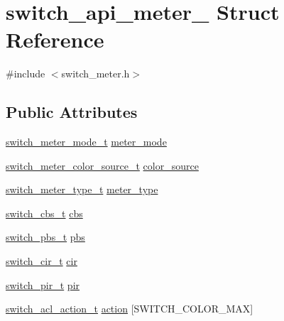 \hypertarget{structswitch__api__meter__}{\section{switch\+\_\+api\+\_\+meter\+\_\+ Struct Reference}
\label{structswitch__api__meter__}
}


{\ttfamily \#include $<$switch\+\_\+meter.\+h$>$}

\subsection*{Public Attributes}
\begin{DoxyCompactItemize}
\item 
\hyperlink{group__Meters_ga3fa4bfd778bf4f4b0f4bebef85f70284}{switch\+\_\+meter\+\_\+mode\+\_\+t} \hyperlink{structswitch__api__meter___a605f435903aa93df506e45ca7acae9fb}{meter\+\_\+mode}
\item 
\hyperlink{group__Meters_ga5406e13de6b3be14a1ec8dd74ede4c55}{switch\+\_\+meter\+\_\+color\+\_\+source\+\_\+t} \hyperlink{structswitch__api__meter___afe1e9c1c8e262479e69438bd9c6a48a8}{color\+\_\+source}
\item 
\hyperlink{group__Meters_ga034a9655e1bdea0a64731ad6e6b375d6}{switch\+\_\+meter\+\_\+type\+\_\+t} \hyperlink{structswitch__api__meter___a7e99349d0f073fdc4a1ad2777f5e53bd}{meter\+\_\+type}
\item 
\hyperlink{group__Meters_ga244ef2ce05d89f779a221e79f1550c84}{switch\+\_\+cbs\+\_\+t} \hyperlink{structswitch__api__meter___a864fa5ab0317ac119f0e967c9f289cd7}{cbs}
\item 
\hyperlink{group__Meters_gafe2932127c3ce04089562a657642f3d5}{switch\+\_\+pbs\+\_\+t} \hyperlink{structswitch__api__meter___a2af25c415c5ddcb07f862b713c32fcf6}{pbs}
\item 
\hyperlink{group__Meters_gaec2972cd53996da2a473dd74a55f4357}{switch\+\_\+cir\+\_\+t} \hyperlink{structswitch__api__meter___ac43cc00423459a18d768f3c39540a415}{cir}
\item 
\hyperlink{group__Meters_gae137996a5fcd00a72cb59367ebb7d711}{switch\+\_\+pir\+\_\+t} \hyperlink{structswitch__api__meter___a4f9e0af4278f74d3889e5b41cb8cdf97}{pir}
\item 
\hyperlink{group__ACL_ga9e512fe793010aac7829bb2fbef4764d}{switch\+\_\+acl\+\_\+action\+\_\+t} \hyperlink{structswitch__api__meter___a638ba8d1ef1924c93d7e1ce1e8b058cb}{action} \mbox{[}S\+W\+I\+T\+C\+H\+\_\+\+C\+O\+L\+O\+R\+\_\+\+M\+A\+X\mbox{]}
\end{DoxyCompactItemize}


